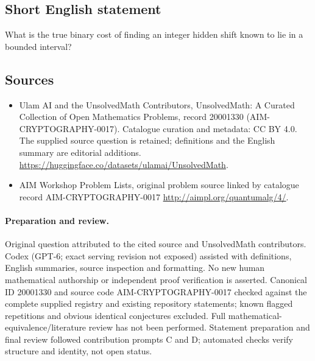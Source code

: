 \documentclass[11pt]{article}
\begin{document}
\subsection{Short English statement}
What is the true binary cost of finding an integer hidden shift known to lie in a bounded interval?
\subsection{Sources}
\begin{itemize}
\item[\hypertarget{source:20001330:1}{S1}] Ulam AI and the UnsolvedMath Contributors, UnsolvedMath: A Curated Collection of Open Mathematics Problems, record 20001330 (AIM-CRYPTOGRAPHY-0017). Catalogue curation and metadata: CC BY 4.0. The supplied source question is retained; definitions and the English summary are editorial additions.
\url{https://huggingface.co/datasets/ulamai/UnsolvedMath}.
\item[\hypertarget{source:20001330:2}{S2}] AIM Workshop Problem Lists, original problem source linked by catalogue record AIM-CRYPTOGRAPHY-0017
\url{http://aimpl.org/quantumalg/4/}.
\end{itemize}
\paragraph{Preparation and review.}
Original question attributed to the cited source and UnsolvedMath contributors. Codex (GPT-6; exact serving revision not exposed) assisted with definitions, English summaries, source inspection and formatting. No new human mathematical authorship or independent proof verification is asserted. Canonical ID 20001330 and source code AIM-CRYPTOGRAPHY-0017 checked against the complete supplied registry and existing repository statements; known flagged repetitions and obvious identical conjectures excluded. Full mathematical-equivalence/literature review has not been performed. Statement preparation and final review followed contribution prompts C and D; automated checks verify structure and identity, not open status.
\label{end:20001330}
\end{document}
